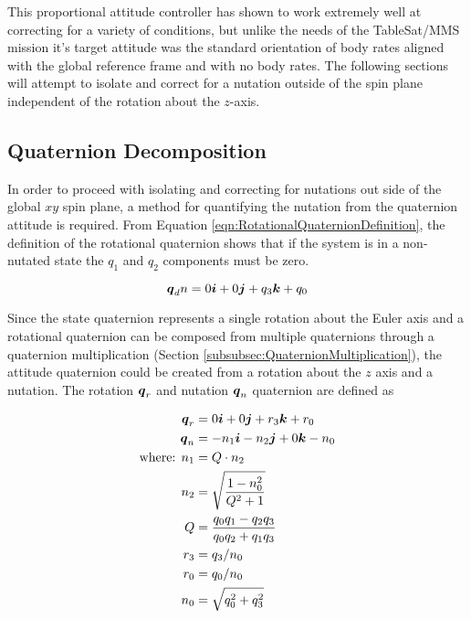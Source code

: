 This proportional attitude controller has shown to work extremely well at correcting for a variety of conditions, but unlike the needs of the TableSat/MMS mission it's target attitude was the standard orientation of body rates aligned with the global reference frame and with no body rates.  The following sections will attempt to isolate and correct for a nutation outside of the spin plane independent of the rotation about the $z$-axis.

\subsection{Quaternion Decomposition}
\label{subsec:QuaternionDecomposition}

In order to proceed with isolating and correcting for nutations out side of the global $xy$ spin plane, a method for quantifying the nutation from the quaternion attitude is required.  From Equation \ref{eqn:RotationalQuaternionDefinition}, the definition of the rotational quaternion shows that if the system is in a non-nutated state the $q_1$ and $q_2$ components must be zero.

\begin{equation}
  \boldsymbol{q}_dn = 0 \boldsymbol{i} + 0 \boldsymbol{j} +q_3 \boldsymbol{k} + q_0
  \label{eqn:NutationDesiredQuaternion}
\end{equation}

Since the state quaternion represents a single rotation about the Euler axis and a rotational quaternion can be composed from multiple quaternions through a quaternion multiplication (Section \ref{subsubsec:QuaternionMultiplication}), the attitude quaternion could be created from a rotation about the $z$ axis and a nutation.  The rotation $\boldsymbol{q}_r$ and nutation $\boldsymbol{q}_n$ quaternion are defined as

\begin{subequations}
  \begin{align}
    \boldsymbol{q}_r &= 0 \boldsymbol{i} + 0 \boldsymbol{j} + r_3 \boldsymbol{k} + r_0\\
    \boldsymbol{q}_n &= -n_1 \boldsymbol{i} - n_2 \boldsymbol{j} + 0 \boldsymbol{k} - n_0 \\
    \text{where: } n_1 &= Q \cdot n_2 \\
    n_2 &= \sqrt{\frac{1 - n_0^2}{Q^2 + 1}} \\
    Q &= \frac{q_0 q_1 - q_2 q_3}{q_0 q_2 + q_1 q_3} \\
    r_3 &= q_3 / n_0 \\
    r_0 &= q_0 / n_0 \\
    n_0 &= \sqrt{q_0^2 + q_3^2}
  \end{align}
  \label{eqn:DecomposeQuaternion}
\end{subequations}

